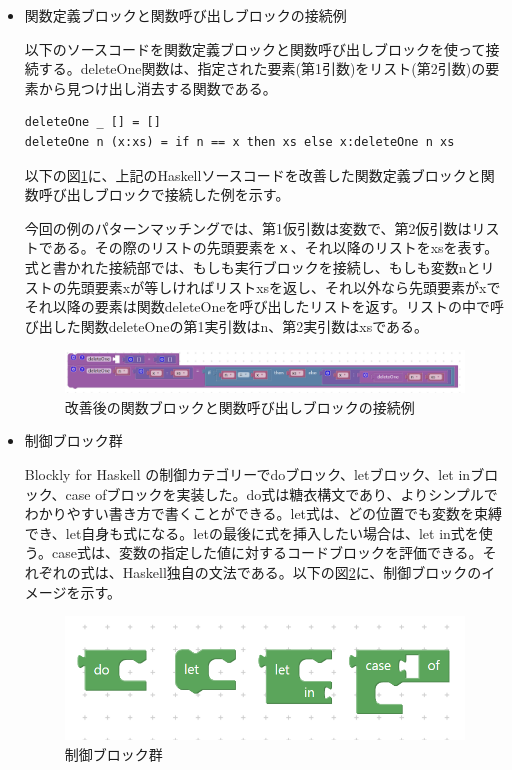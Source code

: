 \documentclass{risepaper}
\begin{document}
\begin{itemize}
\item 関数定義ブロックと関数呼び出しブロックの接続例

以下のソースコードを関数定義ブロックと関数呼び出しブロックを使って接続する。deleteOne関数は、指定された要素(第1引数)をリスト(第2引数)の要素から見つけ出し消去する関数である。
\begin{lstlisting}[basicstyle=\ttfamily\footnotesize]
deleteOne _ [] = []
deleteOne n (x:xs) = if n == x then xs else x:deleteOne n xs
\end{lstlisting}

以下の図\ref{fig:haskell_function_example}に、上記のHaskellソースコードを改善した関数定義ブロックと関数呼び出しブロックで接続した例を示す。

今回の例のパターンマッチングでは、第1仮引数は変数で、第2仮引数はリストである。その際のリストの先頭要素をｘ、それ以降のリストをxsを表す。式と書かれた接続部では、もしも実行ブロックを接続し、もしも変数nとリストの先頭要素xが等しければリストxsを返し、それ以外なら先頭要素がxでそれ以降の要素は関数deleteOneを呼び出したリストを返す。リストの中で呼び出した関数deleteOneの第1実引数はn、第2実引数はxsである。

\begin{figure}[h]
\begin{center}
\includegraphics[scale=0.5]{img/haskell_function_example.PNG}
\caption{改善後の関数ブロックと関数呼び出しブロックの接続例}%
\label{fig:haskell_function_example}
\end{center}%
\end{figure}%

\item 制御ブロック群

Blockly for Haskell の制御カテゴリーでdoブロック、letブロック、let inブロック、case ofブロックを実装した。do式は糖衣構文であり、よりシンプルでわかりやすい書き方で書くことができる。let式は、どの位置でも変数を束縛でき、let自身も式になる。letの最後に式を挿入したい場合は、let in式を使う。case式は、変数の指定した値に対するコードブロックを評価できる。それぞれの式は、Haskell独自の文法である。以下の図\ref{fig:haskell_control}に、制御ブロックのイメージを示す。

\begin{figure}[h]
\begin{center}
\includegraphics[scale=0.5]{img/haskell_control.PNG}
\caption{制御ブロック群}%
\label{fig:haskell_control}
\end{center}%
\end{figure}%


\end{itemize}
\end{document}
